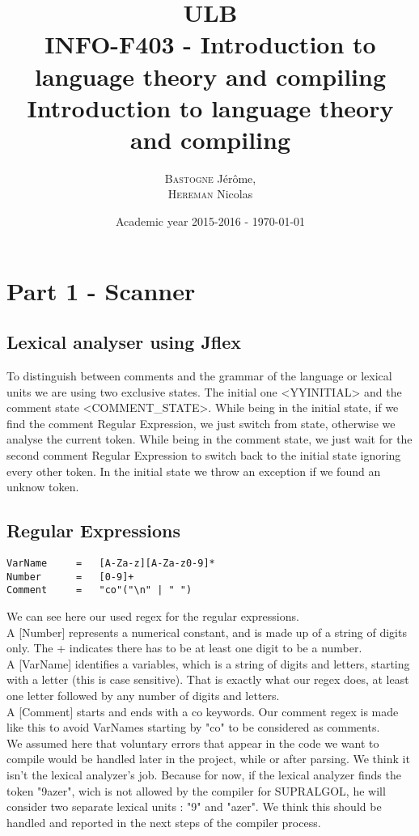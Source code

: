\documentclass[a4paper,10pt]{report}
\title{ULB\\
        INFO-F403 - Introduction to language theory and compiling \\
            Introduction to language theory and compiling}
\author{\textsc{Bastogne} Jérôme,\\
        \textsc{Hereman} Nicolas}
\date{Academic year 2015-2016 - \today}
\begin{document}
\maketitle
\clearpage


\chapter{Part 1 - Scanner}

\section{Lexical analyser using Jflex}

To distinguish between comments and the grammar of the language or lexical units we are using two exclusive states. The initial one <YYINITIAL> and the comment state <COMMENT\_STATE>. While being in the initial state, if we find the comment Regular Expression, we just switch from state, otherwise we analyse the current token. While being in the comment state, we just wait for the second comment Regular Expression to switch back to the initial state ignoring every other token. In the initial state we throw an exception if we found an unknow token.

\section{Regular Expressions}

\begin{lstlisting}
VarName		=	[A-Za-z][A-Za-z0-9]*
Number		=	[0-9]+
Comment		=	"co"("\n" | " ")
\end{lstlisting}
We can see here our used regex for the regular expressions.\\
A [Number] represents a numerical constant, and is made up of a string of digits only. The + indicates there has to be at least one digit to be a number.\\
A [VarName] identifies a variables, which is a string of digits and letters, starting with a letter (this is case sensitive). That is exactly what our regex does, at least one letter followed by any number of digits and letters.\\
A [Comment] starts and ends with a co keywords. Our comment regex is made like this to avoid VarNames starting by "co" to be considered as comments.\\
We assumed here that voluntary errors that appear in the code we want to compile would be handled later in the project, while or after parsing. We think it isn't the lexical analyzer's job. Because for now, if the lexical analyzer finds the token "9azer", wich is not allowed by the compiler for SUPRALGOL, he will consider two separate lexical units : "9" and "azer". We think this should be handled and reported in the next steps of the compiler process.
\end{document}
